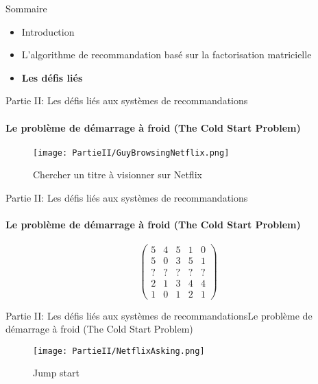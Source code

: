 \newcommand{\PartieII}{Partie II: Les défis liés aux systèmes de recommandations}
\newcommand{\ColdStart}{Le problème de démarrage à froid (The Cold Start Problem)}
\newcommand{\Bias}{Les biais liés aux systèmes de recommandations}

\begin{frame}{Sommaire}
    \begin{itemize}
        \item Introduction
        \item L'algorithme de recommandation basé sur la factorisation matricielle
        \item \textbf{Les défis liés}
    \end{itemize}
\end{frame}

\begin{frame}{\PartieII}
    \framesubtitle{\ColdStart}

    \begin{figure}
        \centering
        \texttt{[image: PartieII/GuyBrowsingNetflix.png]}
        \caption{Chercher un titre à visionner sur Netflix}
    \end{figure}

\end{frame}

\begin{frame}{\PartieII}
    \framesubtitle{\ColdStart}

    \begin{figure}
        \[
            \begin{pmatrix}
                5 & 4 & 5 & 1 & 0 \\
                5 & 0 & 3 & 5 & 1 \\
                ? & ? & ? & ? & ? \\
                2 & 1 & 3 & 4 & 4 \\
                1 & 0 & 1 & 2 & 1
            \end{pmatrix}
        \]

    \end{figure}

\end{frame}

\begin{frame}{\PartieII}{\ColdStart}

    \begin{figure}
        \centering
        \texttt{[image: PartieII/NetflixAsking.png]}
        \caption{Jump start}
    \end{figure}

\end{frame}

